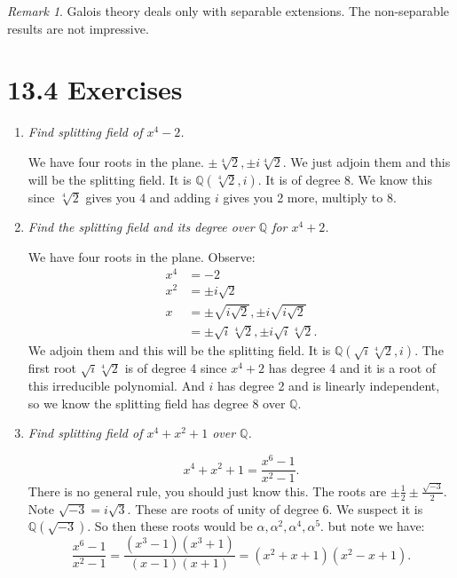 \documentclass[9pt,reqno,twoside]{amsbook}
\theoremstyle{plain}
\numberwithin{section}{chapter}
\numberwithin{equation}{chapter}
\theoremstyle{definition}
\theoremstyle{remark}
\newtheorem{rem}[theorem]{Remark}
\theoremstyle{plain}
\newcommand{\Q}{\mathbb{Q}}
\newcommand{\bee}{\begin{equation}\begin{aligned}}
\newcommand{\eee}{\end{aligned}\end{equation}}
\newcommand{\fracc}{\frac}
\begin{document}
\begin{rem}
Galois theory deals only with separable extensions. The non-separable results are not impressive. 
\end{rem}




















\section*{13.4 Exercises}

\begin{enumerate}[label=\arabic*.]
\item \textit{Find splitting field of $x^4 - 2$. }

We have four roots in the plane. $\pm \sqrt[4]{2}, \pm i \sqrt[4]{2}$. We just adjoin them and this will be the splitting field. It is $\Q(\sqrt[4]{2},i)$. It is of degree 8. We know this since $\sqrt[4]{2}$ gives you 4 and adding $i$ gives you 2 more, multiply to 8. 

\item \textit{Find the splitting field and its degree over $\Q$ for $x^4 + 2$. }

We have four roots in the plane. Observe:
\bee
x^4 &= -2\\
x^2 &= \pm i\sqrt{2}\\
x &= \pm \sqrt{i \sqrt{2}}, \pm i\sqrt{i\sqrt{2}}\\
&= \pm \sqrt{i}\sqrt[4]{2},\pm i\sqrt{i}\sqrt[4]{2}.
\eee
We adjoin them and this will be the splitting field. It is $\Q(\sqrt{i}\sqrt[4]{2}, i)$. The first root $\sqrt{i}\sqrt[4]{2}$ is of degree 4 since $x^4 + 2$ has degree 4 and it is a root of this irreducible polynomial. And $i$ has degree 2 and is linearly independent, so we know the splitting field has degree 8 over $\Q$. 




\setcounter{enumi}{2}

\item \textit{Find splitting field of $x^4 + x^2 + 1$ over $\Q$. }

$$
x^4 + x^2 + 1 = \fracc{x^6 - 1}{x^2 - 1}.
$$
There is no general rule, you should just know this. The roots are $\pm \fracc{1}{2} \pm \fracc{\sqrt{-3}}{2}$. Note $\sqrt{-3} = i\sqrt{3}$. These are roots of unity of degree 6. We suspect it is $\Q(\sqrt{-3})$. So then these roots would be $\alpha,\alpha^2,\alpha^4,\alpha^5$. but note we have:
$$
\fracc{x^6 - 1}{x^2 - 1} = \fracc{(x^3 - 1)(x^3 + 1)}{(x - 1)(x + 1)} = (x^2 + x + 1)(x^2 - x + 1).
$$



\end{enumerate}
\end{document}
